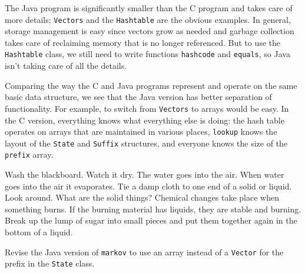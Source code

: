 The Java program is significantly smaller than the C program and takes care
of more details; \verb'Vectors' and the \verb'Hashtable' are the obvious
examples. In general, storage management is easy since vectors grow as
needed and garbage collection takes care of reclaiming memory that is no
longer referenced. But to use the \verb'Hashtable' class, we still need to
write functions \verb'hashcode' and \verb'equals', so Java isn't taking
care of all the details.

Comparing the way the C and Java programs represent and operate on the same
basic data structure, we see that the Java version has better separation of
functionality.  For example, to switch from \verb'Vectors' to arrays would
be easy. In the C version, everything knows what everything else is doing:
the hash table operates on arrays that are maintained in various places,
\verb'lookup' knows the layout of the \verb'State' and \verb'Suffix'
structures, and everyone knows the size of the \verb'prefix' array.
\begin{wellcode}
    Wash the blackboard. Watch it dry. The water goes
    into the air. When water goes into the air it
    evaporates. Tie a damp cloth to one end of a solid or
    liquid. Look around. What are the solid things?
    Chemical changes take place when something burns. If
    the burning material has liquids, they are stable and
    burning. Break up the lump of sugar into small pieces
    and put them together again in the bottom of a liquid.
\end{wellcode}

\begin{wellcode}
    Revise the Java version of \verb'markov' to use an array instead of a
    \verb'Vector' for the prefix in the \verb'State' class.
\end{wellcode}
